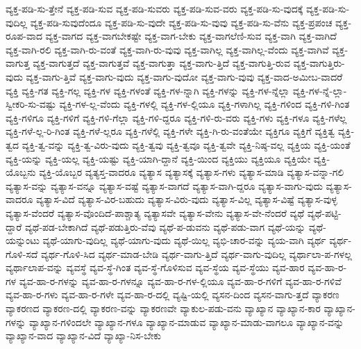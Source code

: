 {ವ್ಯಕ್ತ-ಪಡಿ-ಸು-ತ್ತೇನೆ
ವ್ಯಕ್ತ-ಪಡಿ-ಸುವ
ವ್ಯಕ್ತ-ಪಡಿ-ಸುವರು
ವ್ಯಕ್ತ-ಪಡಿ-ಸುವ-ವರು
ವ್ಯಕ್ತ-ಪಡಿ-ಸು-ವುದಕ್ಕೆ
ವ್ಯಕ್ತ-ಪಡಿ-ಸು-ವುದಿಲ್ಲ
ವ್ಯಕ್ತ-ಪಡಿ-ಸುವುದೆಂದೂ
ವ್ಯಕ್ತ-ಪಡಿ-ಸು-ವುದೇ
ವ್ಯಕ್ತ-ಪಡಿ-ಸು-ವುವು
ವ್ಯಕ್ತ-ಪಡಿ-ಸು-ವೆನು
ವ್ಯಕ್ತ-ಪ್ರಪಂಚ
ವ್ಯಕ್ತ-ರೂಪ-ವಾದ
ವ್ಯಕ್ತ-ವಾಗದ
ವ್ಯಕ್ತ-ವಾಗಬೇಕಷ್ಟೇ
ವ್ಯಕ್ತ-ವಾಗ-ಬೇಕು
ವ್ಯಕ್ತ-ವಾಗಲೆಣಿ-ಸುವ
ವ್ಯಕ್ತ-ವಾಗಿ
ವ್ಯಕ್ತ-ವಾಗಿದೆ
ವ್ಯಕ್ತ-ವಾಗಿ-ರಲಿ
ವ್ಯಕ್ತ-ವಾಗಿ-ರು-ವಂತೆ
ವ್ಯಕ್ತ-ವಾಗಿ-ರು-ವುವು
ವ್ಯಕ್ತ-ವಾಗಿಲ್ಲ
ವ್ಯಕ್ತ-ವಾಗಿಲ್ಲ-ವೆಂದು
ವ್ಯಕ್ತ-ವಾಗಿವೆ
ವ್ಯಕ್ತ-ವಾಗುತ್ತ
ವ್ಯಕ್ತ-ವಾಗುತ್ತದೆ
ವ್ಯಕ್ತ-ವಾಗುತ್ತವೆ
ವ್ಯಕ್ತ-ವಾಗುತ್ತಾ
ವ್ಯಕ್ತ-ವಾಗು-ತ್ತಿದೆ
ವ್ಯಕ್ತ-ವಾಗುತ್ತಿ-ರುವ
ವ್ಯಕ್ತ-ವಾಗುತ್ತಿರು-ವುದು
ವ್ಯಕ್ತ-ವಾಗು-ತ್ತಿವೆ
ವ್ಯಕ್ತ-ವಾಗು-ವುದು
ವ್ಯಕ್ತ-ವಾಗು-ವುದೋ
ವ್ಯಕ್ತ-ವಾಗು-ವುವು
ವ್ಯಕ್ತ-ವಾದ-ಅಮೀಬ-ವಾದರೆ
ವ್ಯಕ್ತಿ
ವ್ಯಕ್ತಿ-ಗತ
ವ್ಯಕ್ತಿ-ಗಲ್ಲ
ವ್ಯಕ್ತಿ-ಗಳ
ವ್ಯಕ್ತಿ-ಗಳಂತೆ
ವ್ಯಕ್ತಿ-ಗಳ-ನ್ನಾಗಿ
ವ್ಯಕ್ತಿ-ಗಳನ್ನು
ವ್ಯಕ್ತಿ-ಗಳ-ನ್ನೆಲ್ಲಾ
ವ್ಯಕ್ತಿ-ಗಳ-ನ್ನೆ-ಲ್ಲಾ-ಸ್ವೀಕರಿ-ಸು-ವಷ್ಟು
ವ್ಯಕ್ತಿ-ಗಳ-ಲ್ಲ-ವೆಂದು
ವ್ಯಕ್ತಿ-ಗಳಲ್ಲಿ
ವ್ಯಕ್ತಿ-ಗಳ-ಲ್ಲಿಯೂ
ವ್ಯಕ್ತಿ-ಗಳಾಗಿಲ್ಲ
ವ್ಯಕ್ತಿ-ಗಳಿಂದ
ವ್ಯಕ್ತಿ-ಗಳಿ-ಗಿಂತ
ವ್ಯಕ್ತಿ-ಗಳಿಗೂ
ವ್ಯಕ್ತಿ-ಗಳಿಗೆ
ವ್ಯಕ್ತಿ-ಗಳಿ-ಗೆಲ್ಲಾ
ವ್ಯಕ್ತಿ-ಗಳಿ-ದ್ದರೂ
ವ್ಯಕ್ತಿ-ಗಳಿ-ರು-ವರು
ವ್ಯಕ್ತಿ-ಗಳು
ವ್ಯಕ್ತಿ-ಗಳೂ
ವ್ಯಕ್ತಿ-ಗಳೆಲ್ಲ
ವ್ಯಕ್ತಿ-ಗಳೆ-ಲ್ಲ-ರಿ-ಗಿಂತ
ವ್ಯಕ್ತಿ-ಗಳೆ-ಲ್ಲರೂ
ವ್ಯಕ್ತಿ-ಗಳೆಲ್ಲಿ
ವ್ಯಕ್ತಿ-ಗಳೇ
ವ್ಯಕ್ತಿ-ಗಿ-ರು-ವಂತೆಯೇ
ವ್ಯಕ್ತಿಗೂ
ವ್ಯಕ್ತಿಗೆ
ವ್ಯಕ್ತಿತ್ವ
ವ್ಯಕ್ತಿ-ತ್ವದ
ವ್ಯಕ್ತಿ-ತ್ವ-ವನ್ನು
ವ್ಯಕ್ತಿ-ತ್ವ-ವಿರು-ವುದು
ವ್ಯಕ್ತಿ-ತ್ವವು
ವ್ಯಕ್ತಿ-ತ್ವವೂ
ವ್ಯಕ್ತಿ-ತ್ವವೇ
ವ್ಯಕ್ತಿ-ನಿಷ್ಠ-ವಲ್ಲ
ವ್ಯಕ್ತಿಯ
ವ್ಯಕ್ತಿ-ಯಂತೆ
ವ್ಯಕ್ತಿ-ಯನ್ನು
ವ್ಯಕ್ತಿ-ಯಲ್ಲ
ವ್ಯಕ್ತಿ-ಯಷ್ಟು
ವ್ಯಕ್ತಿ-ಯಾಗಿ-ದ್ದಾನೆ
ವ್ಯಕ್ತಿ-ಯಿಂದ
ವ್ಯಕ್ತಿಯು
ವ್ಯಕ್ತಿಯೂ
ವ್ಯಕ್ತಿಯೇ
ವ್ಯಕ್ತಿ-ಯೊಬ್ಬನು
ವ್ಯಕ್ತಿ-ಯೊಬ್ಬರ
ವ್ಯತ್ಯಸ್ತ-ವಾದರೂ
ವ್ಯತ್ಯಾಸ
ವ್ಯತ್ಯಾಸಕ್ಕೆ
ವ್ಯತ್ಯಾಸ-ಗಳು
ವ್ಯತ್ಯಾಸ-ಮಾಡಿ
ವ್ಯತ್ಯಾಸ-ವನ್ನಾ-ಗಲಿ
ವ್ಯತ್ಯಾಸ-ವನ್ನು
ವ್ಯತ್ಯಾಸ-ವನ್ನೂ
ವ್ಯತ್ಯಾಸ-ವಷ್ಟೆ
ವ್ಯತ್ಯಾಸ-ವಾಗದೆ
ವ್ಯತ್ಯಾಸ-ವಾಗಿ-ದ್ದರೂ
ವ್ಯತ್ಯಾಸ-ವಾಗು-ವುದು
ವ್ಯತ್ಯಾಸ-ವಾದರೂ
ವ್ಯತ್ಯಾಸ-ವಿದೆ
ವ್ಯತ್ಯಾಸ-ವಿರ-ಬಹುದು
ವ್ಯತ್ಯಾಸ-ವಿರು-ವುದು
ವ್ಯತ್ಯಾಸ-ವಿಲ್ಲ
ವ್ಯತ್ಯಾಸ-ವಿಷ್ಟೆ
ವ್ಯತ್ಯಾಸ-ವುಳ್ಳ
ವ್ಯತ್ಯಾಸ-ವೆಂದರೆ
ವ್ಯತ್ಯಾಸ-ವೊಂದಿದೆ-ಪಾಶ್ಚಾತ್ಯ
ವ್ಯತ್ಯಾಸವೇ
ವ್ಯತ್ಯಾಸ-ವೇನು
ವ್ಯತ್ಯಾಸ-ವೇ-ನೆಂದರೆ
ವ್ಯಥೆ
ವ್ಯಥೆ-ಪಟ್ಟಿ-ದ್ದಾರೆ
ವ್ಯಥೆ-ಪಡ-ಬೇಕಾಗಿದೆ
ವ್ಯಥೆ-ಪಡುತ್ತಿರು-ವೆವು
ವ್ಯಥೆ-ಪ-ಡುವನು
ವ್ಯಥೆ-ಪಡು-ವಾಗ
ವ್ಯಥೆ-ಯನ್ನು
ವ್ಯಥೆ-ಯನ್ನುಂಟು
ವ್ಯಥೆ-ಯಾಗು-ವುದಿಲ್ಲ
ವ್ಯಥೆ-ಯಾಗು-ವುದು
ವ್ಯಥೆ-ಯಿಲ್ಲ
ವ್ಯಭಿ-ಚಾರ-ವನ್ನು
ವ್ಯಯ-ವಾಗಿ
ವ್ಯರ್ಥ
ವ್ಯರ್ಥ-ಗೊಳಿ-ಸದೆ
ವ್ಯರ್ಥ-ಗೊಳಿ-ಸಿದ
ವ್ಯರ್ಥ-ಮಾಡ-ಬೇಡಿ
ವ್ಯರ್ಥ-ವಾಗು-ತ್ತಿದೆ
ವ್ಯರ್ಥ-ವಾಗು-ವುದಿಲ್ಲ
ವ್ಯರ್ಥಾಲಾ-ಪ-ಗಳಲ್ಲ
ವ್ಯರ್ಥಾಲಾಪ-ವನ್ನು
ವ್ಯವಸ್ಥೆ
ವ್ಯವ-ಸ್ಥೆ-ಗಿಂತ
ವ್ಯವ-ಸ್ಥೆ-ಗೊಳಿಸುವ
ವ್ಯವ-ಸ್ಥೆಯ
ವ್ಯವ-ಸ್ಥೆಯು
ವ್ಯವ-ಹಾರ
ವ್ಯವ-ಹಾ-ರ-ಗಳ
ವ್ಯವ-ಹಾ-ರ-ಗಳನ್ನು
ವ್ಯವ-ಹಾ-ರ-ಗಳನ್ನೂ
ವ್ಯವ-ಹಾ-ರ-ಗಳ-ಲ್ಲಿಯೂ
ವ್ಯವ-ಹಾ-ರ-ಗಳಿಗೆ
ವ್ಯವ-ಹಾ-ರ-ಗಳಿವೆ
ವ್ಯವ-ಹಾ-ರ-ಗಳು
ವ್ಯವ-ಹಾ-ರ-ಗಳೇ
ವ್ಯವ-ಹಾ-ರ-ದಲ್ಲಿ
ವ್ಯಷ್ಟಿ-ಯಲ್ಲಿ
ವ್ಯಸನ-ದಿಂದ
ವ್ಯಸನ-ವಾಗು-ತ್ತದೆ
ವ್ಯಾಕರಣ
ವ್ಯಾಕರಣದ
ವ್ಯಾಕರಣ-ದಲ್ಲಿ
ವ್ಯಾಕರಣ-ವನ್ನು
ವ್ಯಾಕರಣವೇ
ವ್ಯಾಕುಲ-ಪಡು-ವನು
ವ್ಯಾಖ್ಯಾನ
ವ್ಯಾಖ್ಯಾನ-ಕಾರ
ವ್ಯಾಖ್ಯಾನ-ಗಳನ್ನು
ವ್ಯಾಖ್ಯಾನ-ಗಳಿಂದಲೇ
ವ್ಯಾಖ್ಯಾನ-ಗಳೂ
ವ್ಯಾಖ್ಯಾನ-ಮಾಡುವ
ವ್ಯಾಖ್ಯಾನ-ಮಾಡು-ವಾಗಲೂ
ವ್ಯಾಖ್ಯಾನ-ವನ್ನು
ವ್ಯಾಖ್ಯಾನ-ವಾದ
ವ್ಯಾಖ್ಯಾನ-ವಿದೆ
ವ್ಯಾಖ್ಯಾ-ನಿಸ-ಬೇಕು
}
